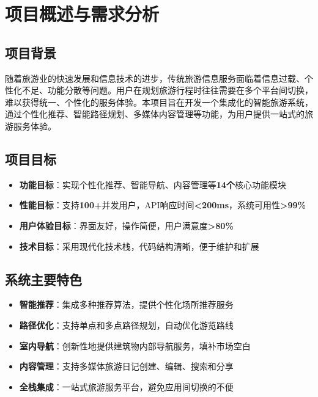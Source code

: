 \documentclass[12pt,a4paper]{article}
\begin{document}
\newpage

\renewcommand{\contentsname}{\color{primary}\Large\textbf{目录}}
\tableofcontents
\newpage

\section{项目概述与需求分析}

\subsection{项目背景}
随着旅游业的快速发展和信息技术的进步，传统旅游信息服务面临着信息过载、个性化不足、功能分散等问题。用户在规划旅游行程时往往需要在多个平台间切换，难以获得统一、个性化的服务体验。本项目旨在开发一个集成化的智能旅游系统，通过个性化推荐、智能路径规划、多媒体内容管理等功能，为用户提供一站式的旅游服务体验。

\subsection{项目目标}

\begin{successbox}[title={项目核心目标}]
\begin{itemize}[nosep]
    \item \textbf{功能目标}：实现个性化推荐、智能导航、内容管理等\textcolor{primary}{\textbf{14个}}核心功能模块
    \item \textbf{性能目标}：支持\textcolor{success}{\textbf{100+}}并发用户，API响应时间\textcolor{success}{\textbf{<200ms}}，系统可用性\textcolor{success}{\textbf{>99\%}}
    \item \textbf{用户体验目标}：界面友好，操作简便，用户满意度\textcolor{success}{\textbf{>80\%}}
    \item \textbf{技术目标}：采用现代化技术栈，代码结构清晰，便于维护和扩展
\end{itemize}
\end{successbox}

\subsection{系统主要特色}

\begin{infobox}[title={系统核心创新亮点}]
\begin{itemize}[nosep]
    \item \textbf{\textcolor{primary}{智能推荐}}：集成多种推荐算法，提供个性化场所推荐服务
    \item \textbf{\textcolor{secondary}{路径优化}}：支持单点和多点路径规划，自动优化游览路线
    \item \textbf{\textcolor{accent}{室内导航}}：创新性地提供建筑物内部导航服务，填补市场空白
    \item \textbf{\textcolor{success}{内容管理}}：支持多媒体旅游日记创建、编辑、搜索和分享
    \item \textbf{\textcolor{warning}{全栈集成}}：一站式旅游服务平台，避免应用间切换的不便
\end{itemize}
\end{infobox}
\end{document}
